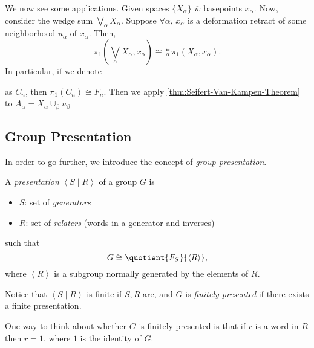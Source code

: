 \begin{eg}
	We now see some applications. Given spaces \(\{X_\alpha \}\) \(\overline{w} \) basepoints \(x_\alpha \). Now, consider
	the wedge sum \(\bigvee\limits_\alpha X_\alpha \). Suppose \(\forall \alpha\), \(x_\alpha \) is a deformation retract of
	some neighborhood \(u_\alpha \) of \(x_\alpha \). Then,
	\[
		\pi _1\left(\bigvee_\alpha X_\alpha , x_\alpha \right) \cong \underset{\alpha }{\ast}\pi _1\left(X_\alpha , x_\alpha \right).
	\]
	In particular, if we denote
	\begin{figure}[H]
		\centering
		\label{fig:eg-2:Seifert-Van-Kampen-Theorem}
	\end{figure}

	as \(C_n\), then \(\pi _1(C_n)\cong F_n\). Then we apply \autoref{thm:Seifert-Van-Kampen-Theorem} to \(A_\alpha = X_\alpha \cup_{\beta }u_\beta \)
\end{eg}

\subsection{Group Presentation}
In order to go further, we introduce the concept of \emph{group presentation}.
\begin{definition}\label{def:group-presentation}
	A \emph{presentation} \(\left< S \mid R \right> \) of a group \(G\) is
	\begin{itemize}
		\item \(S\): set of \emph{generators}
		\item \(R\): set of \emph{relaters} (words in a generator and inverses)
	\end{itemize}
	such that
	\[
		G\cong \quotient{F_S}{\left< R \right>},
	\]
	where \(\left< R \right> \) is a subgroup normally generated by the elements of \(R\).

	\par Notice that \(\left< S \mid R \right> \) is \underline{finite} if \(S, R\) are, and \(G\) is \emph{finitely presented} if
	there exists a finite presentation.
\end{definition}

\begin{note}
	One way to think about whether \(G\) is \underline{finitely presented} is that if \(r\) is a word in \(R\) then \(r = 1\), where
	\(1\) is the identity of \(G\).
\end{note}

